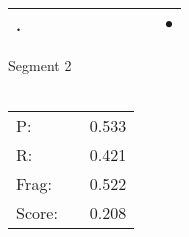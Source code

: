 \documentclass[landscape]{article}
\newcommand{\ssp}{\hspace{2pt}}
\newcommand{\mex}{\cellcolor{g}$\bullet$}
\begin{document}
\begin{tabular}{|l|p{10pt}|p{10pt}|p{10pt}|p{10pt}|p{10pt}|p{10pt}|p{10pt}|p{10pt}|p{10pt}|}
\hline
\ssp \cellcolor{ref8}. \ssp&\hspace{2pt}&\hspace{2pt}&\hspace{2pt}&\hspace{2pt}&\hspace{2pt}&\hspace{2pt}&\hspace{2pt}&\hspace{2pt}&\hspace{2pt}\mex\\
\hline
\end{tabular}

\vspace{6pt}
\noindent Segment 2\\\\
\noindent\begin{tabular}{lm{12pt}r}
\hline
P:&&0.533\\
R:&&0.421\\
Frag:&&0.522\\
Score:&&0.208\\
\end{tabular}

\newpage
\end{document}
